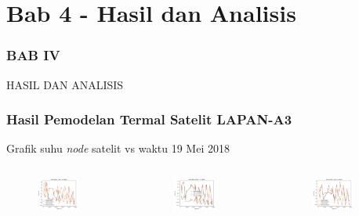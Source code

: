 \documentclass[8pt]{beamer}
\begin{document}
\section{Bab 4 - Hasil dan Analisis}
\begin{frame}
  \frametitle{BAB IV}
  \center \large HASIL DAN ANALISIS
\end{frame}
\begin{frame}
  \frametitle{Hasil Pemodelan Termal Satelit LAPAN-A3}
  \center Grafik suhu \textit{node} satelit vs waktu 19 Mei 2018
  \begin{columns}[T]
      \begin{figure}
          \includegraphics[width=0.7\textwidth]{figure/paper_node12_temp_2018-05-19.png}
      \end{figure}
      \begin{figure}
          \includegraphics[width=0.7\textwidth]{figure/paper_node34_temp_2018-05-19.png}
      \end{figure}
      \begin{figure}
          \includegraphics[width=0.7\textwidth]{figure/paper_node56_temp_2018-05-19.png}

\end{figure}
\end{columns}
\end{frame}
\end{document}
